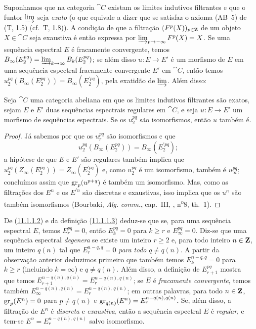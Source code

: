 \begin{env}[11.1.4]
\label{0.11.1.4}
Suponhamos que na categoria $\cat{C}$ existam os limites indutivos filtrantes e que o funtor $\varinjlim$ seja \emph{exato} (o que equivale a dizer que se satisfaz o axioma (AB~5) de (T, 1.5) (cf.~T, 1.8)).
A condição de que a filtração $(F^p(X))_{p\in\mathbf{Z}}$ de um objeto $X\in\cat{C}$ seja exaustiva é então expressa por $\varinjlim_{p\to-\infty}F^p(X)=X$.
Se uma sequência espectral $E$ é fracamente convergente, temos $B_\infty(E_2^{pq})=\varinjlim_{k\to\infty}B_k(E_2^{pq})$; se além disso $u:E\to E'$ é um morfismo de $E$ em uma sequência espectral fracamente convergente $E'$ em $\cat{C}$, então temos $u_2^{pq}(B_\infty(E_2^{pq}))=B_\infty(E_2^{\prime pq})$, pela exatidão de $\varinjlim$.
Além disso:
\end{env}

\begin{proposition}[11.1.5]
\label{0.11.1.5}
Seja $\cat{C}$ uma categoria abeliana em que os limites indutivos filtrantes são exatos, sejam $E$ e $E'$ duas sequências espectrais regulares em $\cat{C}$, e seja $u:E\to E'$ um morfismo de sequências espectrais.
Se os $u_2^{pq}$ são isomorfismos, então $u$ também é.
\end{proposition}

\begin{proof}
Já sabemos por  que os $u_r^{pq}$ são isomorfismos e que
\[
  u_2^{pq}(B_\infty(E_2^{pq}))=B_\infty(E_2^{\prime pq});
\]
a hipótese de que $E$ e $E'$ são regulares também implica que $u_2^{pq}(Z_\infty(E_2^{pq}))=Z_\infty(E_2^{\prime pq})$ e, como $u_2^{pq}$ é um isomorfismo, também é $u_\infty^{pq}$; concluímos assim que $\operatorname{gr}_p(u^{p+q})$ é também um isomorfismo.
Mas, como as filtrações dos $E^n$ e os $E^{\prime n}$ são discretas e exaustivas, isso implica que os $u^n$ são também isomorfismos (Bourbaki, \emph{Alg. comm.}, cap.~III, , n\textsuperscript{o}8, th.~1).
\end{proof}

\begin{env}[11.1.6]
\label{0.11.1.6}
De (\hyperref[0.11.1.1.2]{11.1.1.2}) e da definição (\hyperref[0.11.1.1.3]{11.1.1.3}) deduz-se que se, para uma sequência espectral $E$, temos $E_r^{pq}=0$, então $E_k^{pq}=0$ para $k\geq r$ e $E_\infty^{pq}=0$.
Diz-se que uma sequência espectral \emph{degenera} se existe um inteiro $r\geq 2$ e, para todo inteiro $n\in\mathbf{Z}$, um inteiro $q(n)$ tal que \emph{$E_r^{n-q,q}=0$ para todo $q\neq q(n)$}.
A partir da observação anterior deduzimos primeiro que também temos $E_k^{n-q,q}=0$ para $k\geq r$ (incluindo $k=\infty$) e $q\neq q(n)$.
Além disso, a definição de $E_{r+1}^{pq}$ mostra que temos $E_{r+1}^{n-q(n),q(n)}=E_r^{n-q(n),q(n)}$; se $E$ é \emph{fracamente convergente}, temos também $E_\infty^{n-q(n),q(n)}=E_r^{n-q(n),q(n)}$; em outras palavras, para todo $n\in\mathbf{Z}$, $\operatorname{gr}_p(E^n)=0$ para $p\neq q(n)$ e $\operatorname{gr}_{q(n)}(E^n)=E_r^{n-q(n),q(n)}$.
Se, além disso, a filtração de $E^n$ é \emph{discreta} e \emph{exaustiva}, então a sequência espectral $E$ é \emph{regular}, e tem-se $E^n=E_r^{n-q(n),q(n)}$ salvo isomorfismo.
\end{env}

